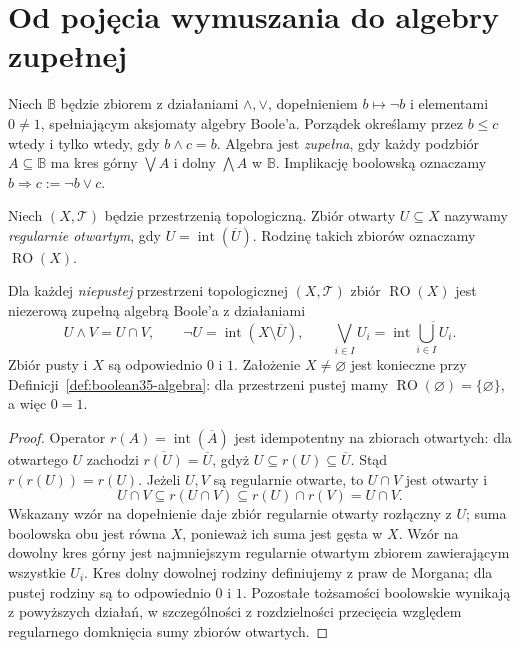 \section{Od pojęcia wymuszania do algebry zupełnej}

\begin{definicja}
\label{def:boolean35-algebra}
Niech $\mathbb B$ będzie zbiorem z działaniami
$\wedge,\vee$, dopełnieniem $b\mapsto\neg b$
i elementami $0\ne1$, spełniającym aksjomaty
algebry Boole'a. Porządek określamy przez
$b\le c$ wtedy i tylko wtedy, gdy $b\wedge c=b$.
Algebra jest \emph{zupełna}, gdy każdy
podzbiór $A\subseteq\mathbb B$ ma kres górny
$\bigvee A$ i dolny $\bigwedge A$ w $\mathbb B$.
Implikację boolowską oznaczamy
$b\Rightarrow c:=\neg b\vee c$.
\end{definicja}

\begin{definicja}
\label{def:boolean35-regular-open}
Niech $(X,\mathcal T)$ będzie przestrzenią
topologiczną. Zbiór otwarty $U\subseteq X$
nazywamy \emph{regularnie otwartym}, gdy
$U=\operatorname{int}(\overline U)$.
Rodzinę takich zbiorów oznaczamy
$\operatorname{RO}(X)$.
\end{definicja}

\begin{lemat}
\label{lem:boolean35-ro-complete}
Dla każdej \emph{niepustej} przestrzeni
topologicznej $(X,\mathcal T)$
zbiór $\operatorname{RO}(X)$
jest niezerową zupełną
algebrą Boole'a z działaniami
\[
 U\wedge V=U\cap V,\qquad
 \neg U=\operatorname{int}(X\setminus\overline U),
 \qquad
 \bigvee_{i\in I}U_i=
 \operatorname{int}\overline{\bigcup_{i\in I}U_i}.
\]
Zbiór pusty i $X$ są odpowiednio $0$ i $1$.
Założenie $X\ne\varnothing$ jest konieczne przy
Definicji~\ref{def:boolean35-algebra}: dla przestrzeni
pustej mamy $\operatorname{RO}(\varnothing)
=\{\varnothing\}$, a więc $0=1$.
\end{lemat}
\begin{proof}
Operator $r(A)=\operatorname{int}(\overline A)$
jest idempotentny na zbiorach otwartych:
dla otwartego $U$ zachodzi
$\overline{r(U)}=\overline U$, gdyż
$U\subseteq r(U)\subseteq\overline U$.
Stąd $r(r(U))=r(U)$.
Jeżeli $U,V$ są regularnie otwarte,
to $U\cap V$ jest otwarty i
\[
 U\cap V\subseteq r(U\cap V)
 \subseteq r(U)\cap r(V)=U\cap V.
\]
Wskazany wzór na dopełnienie daje
zbiór regularnie otwarty rozłączny z $U$;
suma boolowska obu jest równa $X$,
ponieważ ich suma jest gęsta w $X$.
Wzór na dowolny kres górny jest
najmniejszym regularnie otwartym
zbiorem zawierającym wszystkie $U_i$.
Kres dolny dowolnej rodziny definiujemy
z praw de Morgana; dla pustej rodziny
są to odpowiednio $0$ i $1$.
Pozostałe tożsamości boolowskie
wynikają z powyższych działań,
w szczególności z rozdzielności
przecięcia względem regularnego
domknięcia sumy zbiorów otwartych.
\end{proof}

